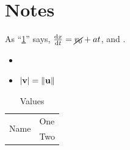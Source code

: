 \documentclass{article}
\begin{document}
\section{Notes}\label{sec:notes}
\begin{tcolorbox}[title=Summary]
  As \enquote{\cref{sec:notes}} says, $\dv{x}{t} = \cancel{v_0} + a t$, and
  .
\end{tcolorbox}
\begin{itemize}[noitemsep]
  \item {}
  \item $\abs{\vb{v}} = \norm{\vb{u}}$
\end{itemize}
\begin{table}[h]
  \caption{Values}
  \begin{tabularx}{0.6\linewidth}{lX}
    \toprule
    \multirow{2}{*}{Name} & One \\
                          & Two \\
    \bottomrule
  \end{tabularx}
\end{table}
\end{document}
